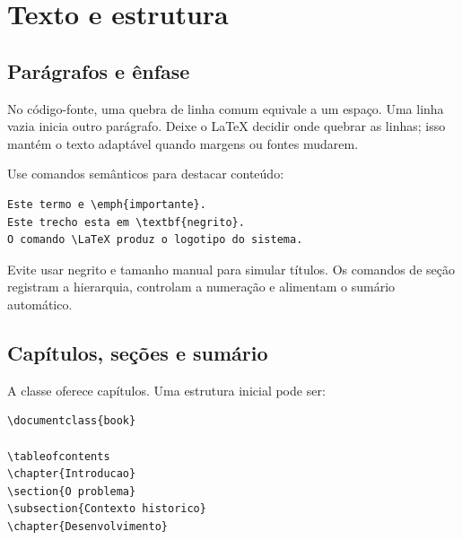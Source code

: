 \chapter{Texto e estrutura}
\label{chap:texto-estrutura}

\section{Parágrafos e ênfase}

No código-fonte, uma quebra de linha comum equivale a um espaço. Uma linha vazia
inicia outro parágrafo. Deixe o LaTeX decidir onde quebrar as linhas; isso mantém
o texto adaptável quando margens ou fontes mudarem.

Use comandos semânticos para destacar conteúdo:

\begin{lstlisting}[language=LaTeXBook]
Este termo e \emph{importante}.
Este trecho esta em \textbf{negrito}.
O comando \LaTeX produz o logotipo do sistema.
\end{lstlisting}

Evite usar negrito e tamanho manual para simular títulos. Os comandos de seção
registram a hierarquia, controlam a numeração e alimentam o sumário automático.

\section{Capítulos, seções e sumário}

A classe  oferece capítulos. Uma estrutura inicial pode ser:

\begin{lstlisting}[language=LaTeXBook]
\documentclass{book}

\tableofcontents
\chapter{Introducao}
\section{O problema}
\subsection{Contexto historico}
\chapter{Desenvolvimento}

\end{lstlisting}

